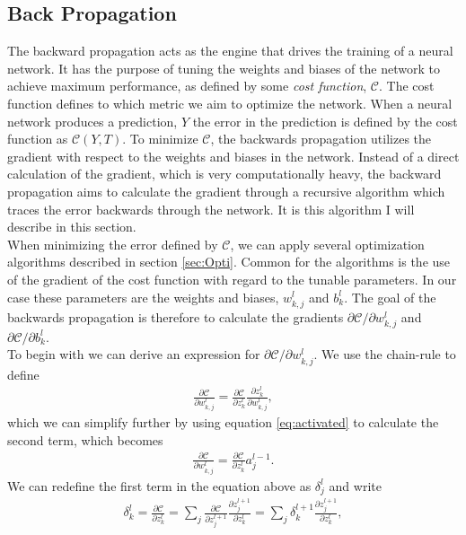 \subsection{Back Propagation}\label{subsec:BP}
The backward propagation acts as the engine that drives the training of a neural network. It has the purpose
of tuning the weights and biases of the network to achieve maximum performance, as defined by some 
\emph{cost function}, $\mathcal{C}$. The cost function defines to which metric we aim to optimize the network. 
When a neural network produces a prediction, $Y$ the error in the prediction
is defined by the cost function as $\mathcal{C}\left(Y, T\right)$. To minimize $\mathcal{C}$, the 
backwards propagation utilizes the gradient with respect to the weights and biases in the network. Instead of a
direct calculation of the gradient, which is very computationally heavy, the backward propagation 
aims to calculate the gradient through a recursive algorithm which traces the error backwards through the network. It is 
this algorithm I will describe in this section.
\\
\newline
When minimizing the error defined by $\mathcal{C}$, we can apply several optimization algorithms described in 
section \ref{sec:Opti}. Common for the algorithms is the use of the gradient of the cost function with regard to 
the tunable parameters. In our case these parameters are the weights and biases, $w_{k,j}^l$ and $b^l_k$. The goal of 
the backwards propagation is therefore to calculate the gradients $\partial \mathcal{C}/\partial w_{k,j}^l$ and
$\partial \mathcal{C}/\partial b^l_k$. 
\\
\newline
To begin with we can derive an expression for $\partial \mathcal{C}/\partial w_{k,j}^l$. We use the chain-rule to define 
\begin{align*}
    \frac{\partial \mathcal{C}}{\partial w_{k,j}^l} = \frac{\partial \mathcal{C}}{\partial z^l_k} \frac{\partial z^l_k}{\partial w_{k,j}^l},
\end{align*}
which we can simplify further by using equation \ref{eq:activated} to calculate the second term, which becomes
\begin{align*}
    \frac{\partial \mathcal{C}}{\partial w_{k,j}^l} = \frac{\partial \mathcal{C}}{\partial z^l_k} a^{l-1}_j.
\end{align*}
We can redefine the first term in the equation above as $\delta_j^l$ and write
\begin{align*}
    \delta_k^l = \frac{\partial \mathcal{C}}{\partial z^l_k}
               = \sum_j \frac{\partial \mathcal{C}}{\partial z^{l+1}_j}\frac{\partial z_j^{l+1}}{\partial z^l_k}  
               = \sum_j \delta_k^{l+1}\frac{\partial z_j^{l+1}}{\partial z^l_k},
\end{align*}
